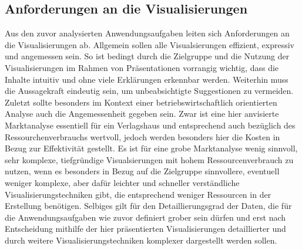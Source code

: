 \documentclass[usegeometry=true]{scrartcl}
\begin{document}
\subsection{Anforderungen an die Visualisierungen}
Aus den zuvor analysierten Anwendungsaufgaben leiten sich Anforderungen an die Visualisierungen ab. 
Allgemein sollen alle Visualsierungen effizient, expressiv und angemessen sein. %
So ist bedingt durch die Zielgruppe und die Nutzung der Visualisierungen im Rahmen von Präsentationen vorrangig wichtig, dass die Inhalte intuitiv und ohne viele Erklärungen erkennbar werden. 
Weiterhin muss die Aussagekraft eindeutig sein, um unbeabsichtigte Suggestionen zu vermeiden. 
Zuletzt sollte besonders im Kontext einer betriebswirtschaftlich orientierten Analyse auch die Angemessenheit gegeben sein. 
Zwar ist eine hier anvisierte Marktanalyse essentiell für ein Verlagshaus und entsprechend auch bezüglich des Ressourchenverbrauchs wertvoll, jedoch werden besonders hier die Kosten in Bezug zur Effektivität gestellt. 
Es ist für eine grobe Marktanalyse wenig sinnvoll, sehr komplexe, tiefgründige Visualsierungen mit hohem Ressourcenverbrauch zu nutzen, wenn es besonders in Bezug auf die Zielgruppe sinnvollere, eventuell weniger komplexe, 
aber dafür leichter und schneller verständliche Visualisierungstechniken gibt, die entsprechend weniger Ressourcen in der Erstellung benötigen. 
Selbiges gilt für den Detaillierungsgrad der Daten, die für die Anwendungsaufgaben wie zuvor definiert grober sein dürfen und erst nach Entscheidung mithilfe der hier präsentierten Visualisierungen detaillierter und durch weitere Visualisierungstechniken komplexer dargestellt werden sollen.
\end{document}
